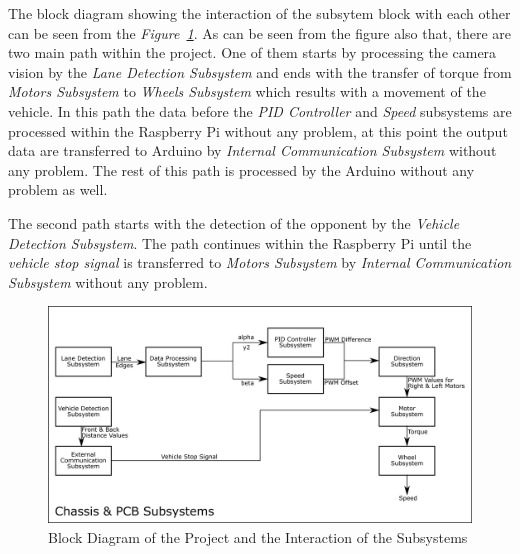 \documentclass[a4paper,12pt]{article}
\begin{document}
	
	The block diagram showing the interaction of the subsytem block with each other can be seen from the \textit{Figure~\ref{fig:subsys-block}}. As can be seen from the figure also that, there are two main path within the project. One of them starts by processing the camera vision by the \textit{Lane Detection Subsystem} and ends with the transfer of torque from \textit{Motors Subsystem} to \textit{Wheels Subsystem} which results with a movement of the vehicle. In this path the data before the \textit{PID Controller} and \textit{Speed} subsystems are processed within the Raspberry Pi without any problem, at this point the output data are transferred to Arduino by \textit{Internal Communication Subsystem} without any problem. The rest of this path is processed by the Arduino without any problem as well.
	
	The second path starts with the detection of the opponent by the \textit{Vehicle Detection Subsystem}. The path continues within the Raspberry Pi until the \textit{vehicle stop signal} is transferred to \textit{Motors Subsystem} by \textit{Internal Communication Subsystem} without any problem.
	

	\begin{figure}[h]
		\includegraphics[width=\textwidth,center]{images/subsys_block}
		\caption{Block Diagram of the Project and the Interaction of the Subsystems}\label{fig:subsys-block}
	\end{figure}
	
	
	
		
	
\end{document}
